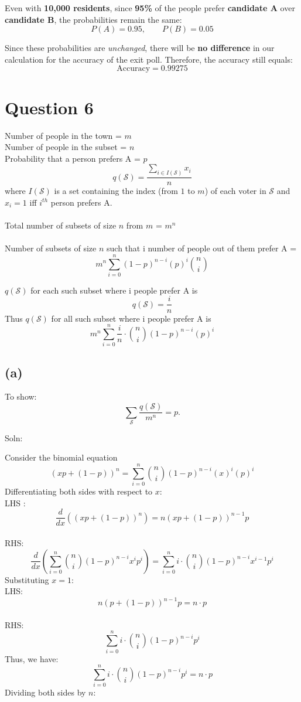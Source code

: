 \documentclass{report}
\begin{document}
\vspace{1em}

\noindent
Even with \textbf{10,000 residents}, since \textbf{95\%} of the people prefer \textbf{candidate A} over \textbf{candidate B}, the probabilities remain the same:
\[
P(A) = 0.95, \qquad P(B) = 0.05
\]

\noindent
Since these probabilities are \textit{unchanged}, there will be \textbf{no difference} in our calculation for the accuracy of the exit poll. Therefore, the accuracy still equals:
\[
\text{Accuracy} = \mathbf{0.99275}
\]


\section*{Question 6}

Number of people in the town = \( m \) \\
Number of people in the subset = \( n \) \\
Probability that a person prefers A = \( p \) \\
\[
q(\mathcal{S}) = \frac{\sum_{i \in I(\mathcal{S})} x_i}{n}
\]
where \( I(\mathcal{S}) \) is a set containing the index (from \(1\) to \(m\)) of each voter in \(\mathcal{S}\) and \(x_i = 1\) iff \( i^{th}\) person prefers A.
\\ \\
Total number of subsets of size \( n \) from \( m \) = \(m ^ n\)\\\\
Number of subsets of size \(n\) such that i number of people out of them prefer A = \[ m^n \sum_{i=0}^{n} (1-p) ^{n - i} (p)^i\binom{n}{i} \]

\(q(\mathcal{S})\) for each such subset where i people prefer A is 
\[q(\mathcal{S}) = \frac{i}{n}\]
 Thus \(q(\mathcal{S})\) for all such subset where i people prefer A is 
\[m^n \sum_{i=0}^{n} \frac{i}{n} \cdot \binom{n}{i}(1-p) ^{n - i} (p)^i\] 

\subsection*{(a)}
To show:
\[
\sum_\mathcal{S} \frac{q(\mathcal{S})}{m^{n}} = p.
\]

Soln:

Consider the binomial equation
\[(xp + (1-p))^n = \sum_{i=0}^{n}\binom{n}{i}(1-p) ^{n - i} (x)^i(p)^i\]
Differentiating both sides with respect to \(x\):
\\LHS : 
\[\frac{d}{dx}((xp + (1-p))^n) = n(xp + (1-p))^{n-1}p\]
\\RHS:
\[\frac{d}{dx}(\sum_{i=0}^{n}\binom{n}{i}(1-p)^{n-i}x^i p^i) = \sum_{i=0}^{n} i \cdot \binom{n}{i}(1-p)^{n-i}x^{i-1}p^i\]
Substituting \(x = 1\):
\\LHS:
\[n(p + (1-p))^{n-1}p = n \cdot p\]
\\RHS:
\[\sum_{i=0}^{n} i \cdot \binom{n}{i}(1-p)^{n-i}p^i\]
Thus, we have:
\begin{equation}
\sum_{i=0}^{n} i \cdot \binom{n}{i}(1-p)^{n-i}p^i = n \cdot p
\label{eq:binomial_diff}
\end{equation}
Dividing both sides by \(n\):
\end{document}
